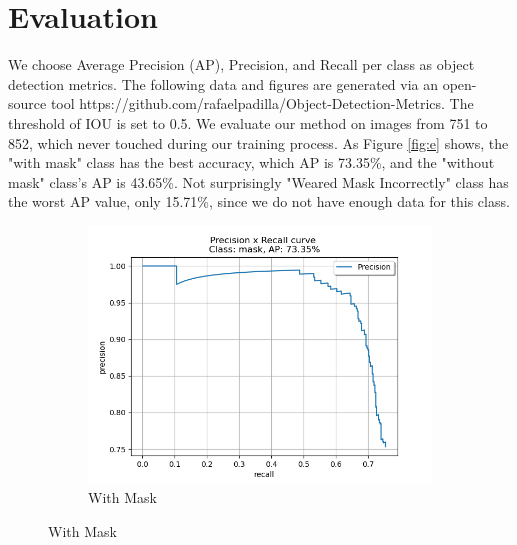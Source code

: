 \documentclass[10pt,a4paper]{report}
\begin{document}
\chapter{Evaluation}
We choose Average Precision (AP), Precision, and Recall per class as object detection metrics. The following data and figures are generated via an open-source tool https://github.com/rafaelpadilla/Object-Detection-Metrics. The threshold of IOU is set to 0.5. We evaluate our method on images from 751 to 852, which never touched during our training process.
As Figure \ref{fig:e} shows, the "with mask" class has the best accuracy, which AP is 73.35\%, and the "without mask" class's AP is 43.65\%. Not surprisingly "Weared Mask Incorrectly" class has the worst AP value, only 15.71\%, since we do not have enough data for this class.
\begin{figure}[hbtp]
     \centering
     \begin{subfigure}[b]{0.8\textwidth}
         \centering
         \includegraphics[width=\textwidth]{./imgs/mask.png}
         \caption{With Mask}


\end{subfigure}
\end{figure}
\end{document}
